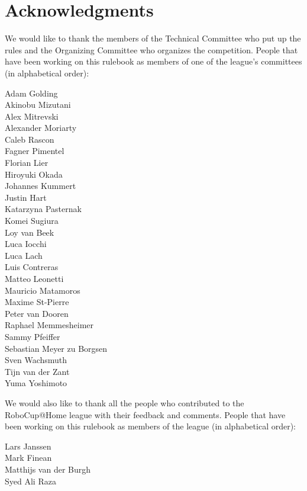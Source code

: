 \section*{Acknowledgments}
\label{sec:acknowledgments}
We would like to thank the members of the Technical Committee who put up the rules and the Organizing Committee who organizes the competition.
People that have been working on this rulebook as members of one of the league's committees (in alphabetical order):
\begin{center}
	\begin{minipage}{0.8\textwidth}
		\begin{multicols}{3}%
			\footnotesize
			\noindent%
			Adam Golding\\
			Akinobu Mizutani\\
			Alex Mitrevski\\
			Alexander Moriarty\\
			Caleb Rascon\\
			Fagner Pimentel\\
			Florian Lier\\
			Hiroyuki Okada\\
			Johannes Kummert\\
			Justin Hart\\
			Katarzyna Pasternak\\
			Komei Sugiura\\
			Loy van Beek\\
			Luca Iocchi\\
			Luca Lach\\
			Luis Contreras\\
			Matteo Leonetti\\
			Mauricio Matamoros\\
			Maxime St-Pierre\\
			Peter van Dooren\\
			Raphael Memmesheimer\\
			Sammy Pfeiffer\\
			Sebastian Meyer zu Borgsen\\
			Sven Wachsmuth\\
			Tijn van der Zant\\
			Yuma Yoshimoto
		\end{multicols}
	\end{minipage}
\end{center}

\noindent We would also like to thank all the people who contributed to the RoboCup@Home league with their feedback and comments.
People that have been working on this rulebook as members of the league (in alphabetical order):
\begin{center}
	\begin{minipage}{0.8\textwidth}
		\begin{multicols}{2}%
			\footnotesize
			\noindent%
			Lars Janssen\\
			Mark Finean\\
			Matthijs van der Burgh\\
			Syed Ali Raza\\
		\end{multicols}
	\end{minipage}
\end{center}


